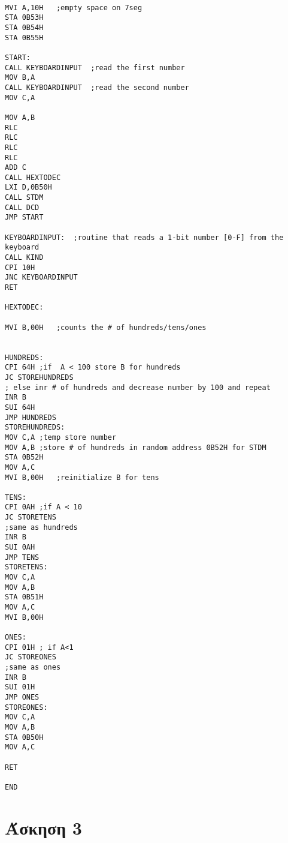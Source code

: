 \documentclass[11pt]{article}
\begin{document}
\begin{verbatim}

MVI A,10H	;empty space on 7seg
STA 0B53H
STA 0B54H
STA 0B55H

START:
CALL KEYBOARDINPUT	;read the first number
MOV B,A
CALL KEYBOARDINPUT	;read the second number
MOV C,A		

MOV A,B
RLC
RLC
RLC
RLC
ADD C
CALL HEXTODEC
LXI D,0B50H
CALL STDM
CALL DCD
JMP START

KEYBOARDINPUT:	;routine that reads a 1-bit number [0-F] from the keyboard
CALL KIND
CPI 10H
JNC KEYBOARDINPUT
RET

HEXTODEC:

MVI B,00H	;counts the # of hundreds/tens/ones 


HUNDREDS:
CPI 64H	;if  A < 100 store B for hundreds
JC STOREHUNDREDS
; else inr # of hundreds and decrease number by 100 and repeat
INR B
SUI 64H
JMP HUNDREDS
STOREHUNDREDS:
MOV C,A	;temp store number
MOV A,B	;store # of hundreds in random address 0B52H for STDM
STA 0B52H
MOV A,C
MVI B,00H	;reinitialize B for tens

TENS:
CPI 0AH	;if A < 10
JC STORETENS
;same as hundreds
INR B
SUI 0AH
JMP TENS
STORETENS:
MOV C,A
MOV A,B
STA 0B51H
MOV A,C
MVI B,00H

ONES:
CPI 01H	; if A<1
JC STOREONES
;same as ones
INR B
SUI 01H
JMP ONES
STOREONES:
MOV C,A
MOV A,B
STA 0B50H
MOV A,C

RET

END

\end{verbatim}

\section*{Άσκηση 3}
\end{document}
